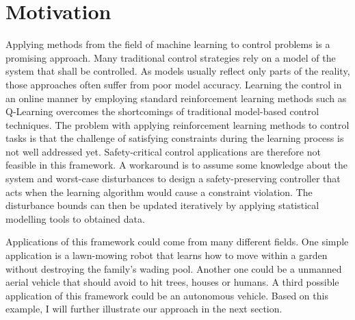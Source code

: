 \documentclass[../main.tex]{subfiles}
\begin{document}
\section{Motivation}
Applying methods from the field of machine learning to control problems is a promising approach. Many traditional control strategies rely on a model of the system that shall be controlled. As models usually reflect only parts of the reality, those approaches often suffer from poor model accuracy. Learning the control in an online manner by employing standard reinforcement learning methods such as Q-Learning overcomes the shortcomings of traditional model-based control techniques. The problem with applying reinforcement learning methods to control tasks is that the challenge of satisfying constraints during the learning process is not well addressed yet. Safety-critical control applications are therefore not feasible in this framework. A workaround is to assume some knowledge about the system and worst-case disturbances to design a safety-preserving controller that acts when the learning algorithm would cause a constraint violation. The disturbance bounds can then be updated iteratively by applying statistical modelling tools to obtained data. \par
Applications of this framework could come from many different fields. One simple application is a lawn-mowing robot that learns how to move within a garden without destroying the family's wading pool. Another one could be a unmanned aerial vehicle that should avoid to hit trees, houses or humans. A third possible application of this framework could be an autonomous vehicle. Based on this example, I will further illustrate our approach in the next section.
\end{document}
